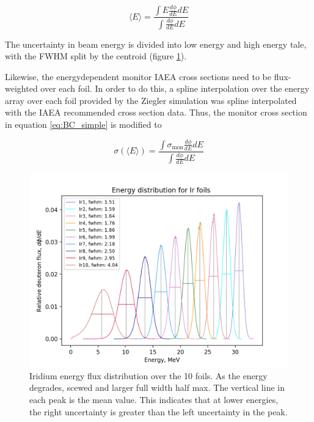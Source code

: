 \begin{equation} \label{eq:flux_weighted_average_energy}
    \langle E \rangle = \frac{\int E \frac{d\phi}{dE}dE}{\int \frac{d\phi}{dE}dE}
\end{equation}

The uncertainty in beam energy is divided into low energy and high energy tale, with the FWHM split by the centroid (figure \ref{fig:ir_energyflux}). 

Likewise, the energydependent monitor IAEA cross sections need to be flux-weighted over each foil. In order to do this, a spline interpolation over the energy array over each foil provided by the Ziegler simulation was spline interpolated with the IAEA recommended cross section data. Thus, the monitor cross section in equation \ref{eq:BC_simple} is modified to 

\begin{equation}
    \sigma (\langle E\rangle) = \frac{\int \sigma_\text{mon} \frac{d\phi}{dE}dE}{\int \frac{d\phi}{dE}dE}
\end{equation}


\begin{figure}
    \centering
    \includegraphics{Analysis/Ir_flux_distribution_B_+2_D_+4,25.png}
    \caption{Iridium energy flux distribution over the 10 foils. As the energy degrades, scewed and larger full width half max. The vertical line in each peak is the mean value. This indicates that at lower energies, the right uncertainty is greater than the left uncertainty in the peak.}
    \label{fig:ir_energyflux}
\end{figure}

